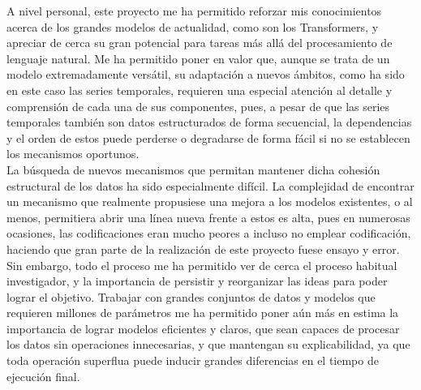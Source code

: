 A nivel personal, este proyecto me ha permitido reforzar mis conocimientos acerca de los grandes modelos de actualidad, como son los Transformers, y apreciar de cerca su gran potencial para tareas más allá del procesamiento de lenguaje natural. Me ha permitido poner en valor que, aunque se trata de un modelo extremadamente versátil, su adaptación a nuevos ámbitos, como ha sido en este caso las series temporales, requieren una especial atención al detalle y comprensión de cada una de sus componentes, pues, a pesar de que las series temporales también son datos estructurados de forma secuencial, la dependencias y el orden de estos puede perderse o degradarse de forma fácil si no se establecen los mecanismos oportunos.\\

La búsqueda de nuevos mecanismos que permitan mantener dicha cohesión estructural de los datos ha sido especialmente difícil. La complejidad de encontrar un mecanismo que realmente propusiese una mejora a los modelos existentes, o al menos, permitiera abrir una línea nueva frente a estos es alta, pues en numerosas ocasiones, las codificaciones eran mucho peores a incluso no emplear codificación, haciendo que gran parte de la realización de este proyecto fuese ensayo y error. Sin embargo, todo el proceso me ha permitido ver de cerca el proceso habitual investigador, y la importancia de persistir y reorganizar las ideas para poder lograr el objetivo. Trabajar con grandes conjuntos de datos y modelos que requieren millones de parámetros me ha permitido poner aún más en estima la importancia de lograr modelos eficientes y claros, que sean capaces de procesar los datos sin operaciones innecesarias, y que mantengan su explicabilidad, ya que toda operación superflua puede inducir grandes diferencias en el tiempo de ejecución final.